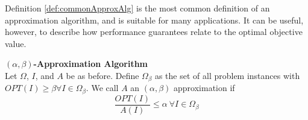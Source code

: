 Definition \ref{def:commonApproxAlg} is the most common definition of an approximation algorithm, and is suitable for many applications. It can be useful, however, to describe how performance guarantees relate to the optimal objective value. 
\begin{definition}
\textbf{$(\alpha,\beta)$-Approximation Algorithm } \\
Let $\Omega$, $I$, and $A$ be as before. 
Define $\Omega_\beta$ as the set of all problem instances with $OPT(I) \geq \beta \forall I \in \Omega_\beta$.
We call $A$ an $(\alpha,\beta)$ approximation if 
\begin{equation*}
\frac{OPT(I)}{A(I)} \leq \alpha ~ \forall I \in \Omega_{\beta}
\end{equation*}
\label{def:twoParamApproxAlg}
\end{definition}
\newpage